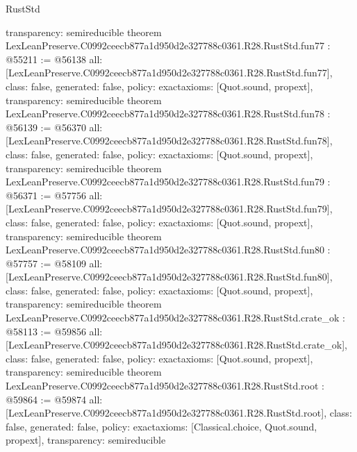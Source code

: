 \begin{lexlean}{RustStd}
\begin{coremodule}
{  transparency: semireducible
}
theorem LexLeanPreserve.C0992ceecb877a1d950d2e327788c0361.R28.RustStd.fun77 : @55211 := @56138 {
  all: [LexLeanPreserve.C0992ceecb877a1d950d2e327788c0361.R28.RustStd.fun77],
  class: false,
  generated: false,
  policy: exact{axioms: [Quot.sound, propext]},
  transparency: semireducible
}
theorem LexLeanPreserve.C0992ceecb877a1d950d2e327788c0361.R28.RustStd.fun78 : @56139 := @56370 {
  all: [LexLeanPreserve.C0992ceecb877a1d950d2e327788c0361.R28.RustStd.fun78],
  class: false,
  generated: false,
  policy: exact{axioms: [Quot.sound, propext]},
  transparency: semireducible
}
theorem LexLeanPreserve.C0992ceecb877a1d950d2e327788c0361.R28.RustStd.fun79 : @56371 := @57756 {
  all: [LexLeanPreserve.C0992ceecb877a1d950d2e327788c0361.R28.RustStd.fun79],
  class: false,
  generated: false,
  policy: exact{axioms: [Quot.sound, propext]},
  transparency: semireducible
}
theorem LexLeanPreserve.C0992ceecb877a1d950d2e327788c0361.R28.RustStd.fun80 : @57757 := @58109 {
  all: [LexLeanPreserve.C0992ceecb877a1d950d2e327788c0361.R28.RustStd.fun80],
  class: false,
  generated: false,
  policy: exact{axioms: [Quot.sound, propext]},
  transparency: semireducible
}
theorem LexLeanPreserve.C0992ceecb877a1d950d2e327788c0361.R28.RustStd.crate_ok : @58113 := @59856 {
  all: [LexLeanPreserve.C0992ceecb877a1d950d2e327788c0361.R28.RustStd.crate_ok],
  class: false,
  generated: false,
  policy: exact{axioms: [Quot.sound, propext]},
  transparency: semireducible
}
theorem LexLeanPreserve.C0992ceecb877a1d950d2e327788c0361.R28.RustStd.root : @59864 := @59874 {
  all: [LexLeanPreserve.C0992ceecb877a1d950d2e327788c0361.R28.RustStd.root],
  class: false,
  generated: false,
  policy: exact{axioms: [Classical.choice, Quot.sound, propext]},
  transparency: semireducible
}


\end{coremodule}
\end{lexlean}
